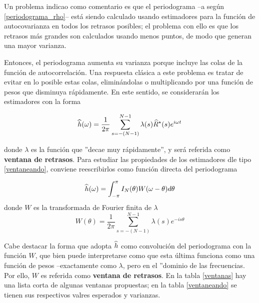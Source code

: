 Un problema indicao como comentario es que el periodograma --a seg\'un \ref{periodograma_rho}--
est\'a siendo calculado usando estimadores para la funci\'on de autocovarianza en todos los 
retrasos posibles; el problema con ello es que los retrasos m\'as grandes son calculados usando
menos puntos, de modo que generan una mayor varianza.

Entonces, el periodograma aumenta su varianza porque incluye las colas de la funci\'on de
autocorrelaci\'on. Una respuesta cl\'asica a este problema es tratar de evitar en lo posible estas
colas, elimin\'andolas o multiplicando por una funci\'on de pesos que disminuya r\'apidamente.
En este sentido, se considerar\'an los estimadores con la forma


\begin{equation}
\widehat{ h }(\omega) = \frac{1}{2\pi} \sum_{s = -(N-1)}^{N-1} 
\lambda(s) \widehat{ R }^{\star}(s) e^{i \omega t}
\label{ventaneando}
\end{equation}

donde $\lambda$ es la funci\'on que ''decae muy r\'apidamente'', y ser\'a referida como
\textbf{ventana de retrasos}. Para estudiar las propiedades de los estimadores
dle tipo \ref{ventaneando}, conviene reescribirlos como funci\'on directa del periodograma

\begin{equation*}
\widehat{ h }(\omega) = \int_{-\pi}^{\pi} I_N(\theta) W(\omega-\theta) d\theta
\end{equation*}
donde $W$ es la transformada de Fourier finita de $\lambda$
\begin{equation*}
W(\theta) = \frac{1}{2\pi} \sum_{s = -(N-1)}^{N-1} \lambda(s) e^{-is\theta}
\end{equation*}

Cabe destacar la forma que adopta $\widehat{ h }$ como convoluci\'on del periodograma con la funci\'on
$W$, que bien puede interpretarse como que esta \'ultima funciona como una funci\'on de pesos
--exactamente como $\lambda$, pero en el ''dominio de las frecuencias. Por ello, $W$ es
referida como \textbf{ventana de retrasos}.
En la tabla \ref{ventanas} hay una lista corta de algunas ventanas propuestas; en la tabla 
\ref{ventaneando}
se tienen sus respectivos valres esperados y varianzas.


